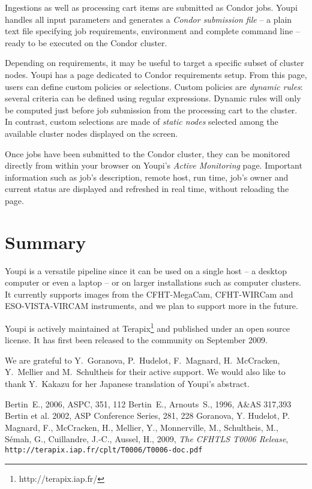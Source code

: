 \documentclass[11pt,twoside]{article}  %
\begin{document}
Ingestions as well as processing cart items are submitted as Condor jobs. Youpi handles all 
input parameters and generates a \emph{Condor submission file} -- a plain text file specifying 
job requirements, environment and complete command line -- ready to be executed on the Condor cluster.

Depending on requirements, it may be useful to target a specific subset of cluster 
nodes. Youpi has a page dedicated to Condor requirements setup. From this page, users can define 
custom policies or selections. Custom policies are \emph{dynamic rules}: several criteria can be 
defined using regular expressions. Dynamic rules will only be computed just before job submission 
from the processing cart to the cluster. In contrast, custom selections are made of \emph{static nodes} 
selected among the available cluster nodes displayed on the screen.

Once jobs have been submitted to the Condor cluster, they can be monitored directly from within 
your browser on Youpi's \emph{Active Monitoring} page. Important information such as job's 
description, remote host, run time, job's owner and current status are displayed and refreshed 
in real time, without reloading the page.

\section{Summary}

Youpi is a versatile pipeline since it can be used on a single host -- a desktop computer or even 
a laptop -- or on larger installations such as computer clusters. It currently supports images 
from the CFHT-MegaCam, CFHT-WIRCam and ESO-VISTA-VIRCAM instruments, and we plan to support more 
in the future. 

Youpi is actively maintained at Terapix\footnote{http://terapix.iap.fr/} and published under an 
open source license. It has first been released to the community on September 2009.

\acknowledgments

We are grateful to Y.\ Goranova, P.\ Hudelot, F.\ Magnard, H.\ McCracken, Y.\ Mellier and 
M.\ Schultheis for their active support. We would also like to thank Y.\ Kakazu for her Japanese
translation of Youpi's abstract.

\begin{references}

 Bertin~E., 2006, ASPC, 351, 112
 Bertin~E., Arnouts~S., 1996, A\&AS 317,393
 Bertin et al. 2002, ASP Conference Series, 281, 228
 Goranova, Y. Hudelot, P. Magnard, F., McCracken, H.,
 Mellier, Y., Monnerville, M., Schultheis, M., S\'emah, G., Cuillandre, J.-C., Aussel, H., 2009, {\it The CFHTLS T0006 Release},
 {\tt http://terapix.iap.fr/cplt/T0006/T0006-doc.pdf}\\
    
\end{references}

\end{document}
